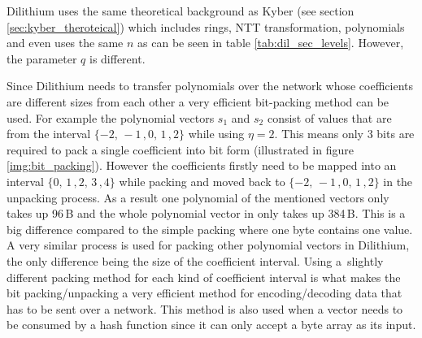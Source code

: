 Dilithium uses the same theoretical background as Kyber (see section \ref{sec:kyber_theroteical}) which includes rings, NTT transformation, polynomials and even uses the same $n$ as can be seen in table \ref{tab:dil_sec_levels}. However, the parameter $q$ is different.


Since Dilithium needs to transfer polynomials over the network whose coefficients are different sizes from each other a very efficient bit-packing method can be used. For example the polynomial vectors $s_1$ and $s_2$ consist of values that are from the interval $\{-2,\,-1\,,0,\,1\,,2\}$ while using $\eta=2$. This means only 3 bits are required to pack a single coefficient into bit form (illustrated in figure \ref{img:bit_packing}). However the coefficients firstly need to be mapped into an interval $\{0,\,1\,,2,\,3\,,4\}$ while packing and moved back to $\{-2,\,-1\,,0,\,1\,,2\}$ in the unpacking process. As a result one polynomial of the mentioned vectors only takes up 96\,B and the whole polynomial vector in only takes up 384\,B. This is a big difference compared to the simple packing where one byte contains one value. A very similar process is used for packing other polynomial vectors in Dilithium, the only difference being the size of the coefficient interval. Using a~slightly different packing method for each kind of coefficient interval is what makes the bit packing/unpacking a very efficient method for encoding/decoding data that has to be sent over a network. This method is also used when a vector needs to be consumed by a hash function since it can only accept a byte array as its input.
